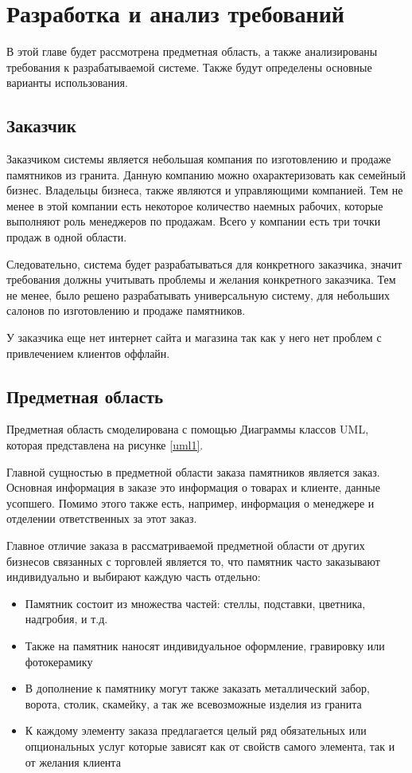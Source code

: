 \documentclass[a4paper,article,14pt]{extarticle}
\begin{document}
\section{Разработка и анализ требований}

В этой главе будет рассмотрена предметная область, а также анализированы требования к разрабатываемой системе.
Также будут определены основные варианты использования.

\subsection{Заказчик}
Заказчиком системы является небольшая компания по изготовлению и продаже памятников из гранита. 
Данную компанию можно охарактеризовать как семейный бизнес.
Владельцы бизнеса, также являются и управляющими компанией. 
Тем не менее в этой компании есть некоторое количество наемных рабочих, которые выполняют роль менеджеров по продажам.
Всего у компании есть три точки продаж в одной области.

Следовательно, система будет разрабатываться для конкретного заказчика, значит требования должны учитывать проблемы и желания
конкретного заказчика. Тем не менее, было решено разрабатывать универсальную систему, для небольших салонов по изготовлению
 и продаже памятников.

У заказчика еще нет интернет сайта и магазина так как у него нет проблем с привлечением клиентов оффлайн.

\subsection{Предметная область}

Предметная область смоделирована с помощью Диаграммы классов UML, которая представлена на рисунке \ref{uml1}.

Главной сущностью в предметной области заказа памятников является заказ.
Основная информация в заказе это информация о товарах и клиенте, данные усопшего.
Помимо этого также есть, например, информация о менеджере и отделении ответственных за этот заказ.

Главное отличие заказа в рассматриваемой предметной области от других бизнесов связанных с торговлей является то, что
памятник часто заказывают индивидуально и выбирают каждую часть отдельно:

\begin{itemize}
    \item Памятник состоит из множества частей: стеллы, подставки, цветника, надгробия, и т.д.
    \item Также на памятник наносят индивидуальное оформление, гравировку или фотокерамику
    \item В дополнение к памятнику могут также заказать металлический забор, ворота, столик, скамейку, а так же всевозможные изделия из гранита
    \item К каждому элементу заказа предлагается целый ряд обязательных 
    или опциональных услуг которые зависят как от свойств самого элемента, так и от желания клиента
\end{itemize}
\end{document}

